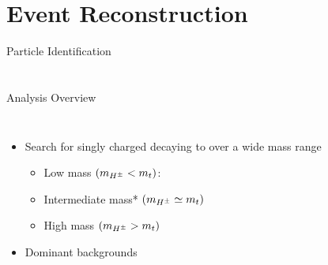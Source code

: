 \documentclass[aspectratio=169,xcolor=table]{beamer}
\begin{document}
\section{Event Reconstruction }
  
  \begin{frame}[t]{Particle Identification}

  \end{frame}

\section{\HpmLong }
  
  \begin{frame}[t]{Analysis Overview}
      \begin{columns}[t]

            \vspace{-20mm}
            \begin{itemize}
              \item Search for singly charged \Hpm decaying to \taunu over a wide mass range
                \begin{itemize}
                  \item Low mass $ (m_{H^{\pm}} < m_{t})$:
                  \item Intermediate mass*  $(m_{H^{\pm}} \simeq m_{t})$
                  \item High mass $(m_{H^{\pm}} > m_{t})$
                \end{itemize}
              \item Dominant backgrounds
              \vspace{-3mm}

\end{itemize}
\end{columns}
\end{frame}
\end{document}
